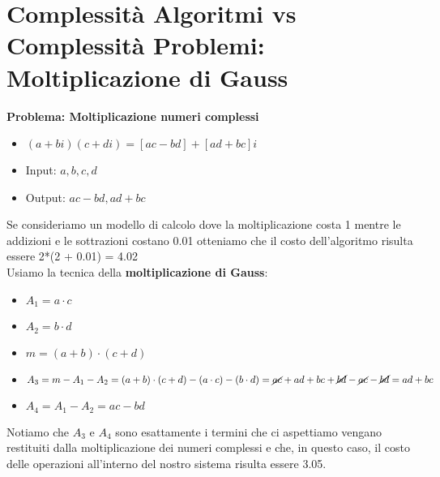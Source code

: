 \documentclass[../cheatSheetAlgoritmi.tex]{subfiles}
\begin{document}
\newpage

\section{Complessità Algoritmi vs Complessità Problemi: Moltiplicazione di Gauss}
\textbf{Problema: Moltiplicazione numeri complessi}
\begin{itemize}
	\item $(a + bi)(c + di) = [ac - bd] + [ad + bc]i$
	\item Input: $a, b, c, d$
	\item Output: $ac - bd, ad + bc$
\end{itemize}
Se consideriamo un modello di calcolo dove la moltiplicazione costa 1 mentre le addizioni e le sottrazioni costano 0.01 otteniamo che il costo dell'algoritmo risulta essere 2*(2 + 0.01) = 4.02\\
Usiamo la tecnica della \textbf{moltiplicazione di Gauss}:
\begin{itemize}
	\item $A_1 = a \cdot c$
	\item $A_2 = b \cdot d$
	\item $m = (a + b) \cdot (c + d)$
	\item $A_3 = m - A_1 - A_2 = (a + b) \cdot (c + d) - (a \cdot c) - (b \cdot d) = \cancel{ac} + ad + bc + \cancel{bd} - \cancel{ac} -\cancel{bd} = ad + bc$
	\item $A_4 = A_1 - A_2 = ac - bd$
\end{itemize}
Notiamo che $A_3$ e $A_4$ sono esattamente i termini che ci aspettiamo vengano restituiti dalla moltiplicazione dei numeri complessi e che, in questo caso, il costo delle operazioni all'interno del nostro sistema risulta essere 3.05.
\end{document}
